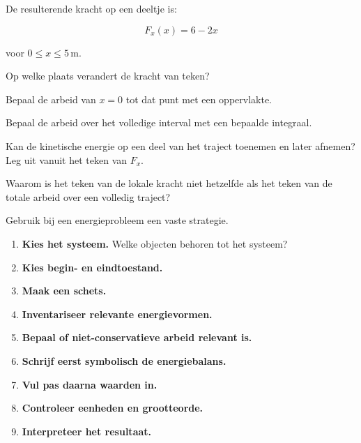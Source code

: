 \documentclass{ximera}
\begin{document}
\begin{oefening}{\oefG}

De resulterende kracht op een deeltje is:

\[
F_x(x)=6-2x
\]

voor $0\leq x\leq5\,\mathrm m$.

\begin{question}
Op welke plaats verandert de kracht van teken?
\end{question}

\begin{question}
Bepaal de arbeid van $x=0$ tot dat punt met een oppervlakte.
\end{question}

\begin{question}
Bepaal de arbeid over het volledige interval met een bepaalde integraal.
\end{question}

\begin{question}
Kan de kinetische energie op een deel van het traject toenemen en later
afnemen? Leg uit vanuit het teken van $F_x$.
\end{question}

\begin{question}
Waarom is het teken van de lokale kracht niet hetzelfde als het teken van de
totale arbeid over een volledig traject?
\end{question}

\end{oefening}



Gebruik bij een energieprobleem een vaste strategie.

\begin{enumerate}
  \item \textbf{Kies het systeem.} Welke objecten behoren tot het systeem?
  \item \textbf{Kies begin- en eindtoestand.}
  \item \textbf{Maak een schets.}
  \item \textbf{Inventariseer relevante energievormen.}
  \item \textbf{Bepaal of niet-conservatieve arbeid relevant is.}
  \item \textbf{Schrijf eerst symbolisch de energiebalans.}
  \item \textbf{Vul pas daarna waarden in.}
  \item \textbf{Controleer eenheden en grootteorde.}
  \item \textbf{Interpreteer het resultaat.}
\end{enumerate}
\end{document}
